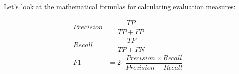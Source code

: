 Let's look at the mathematical formulas for calculating evaluation measures:

\begin{align}
    Precision &= \dfrac{TP}{TP + FP} \\
    Recall &= \dfrac{TP}{TP + FN} \\
    F1 &= 2 \cdot \dfrac{Precision \times Recall }{Precision + Recall} 
\end{align}

